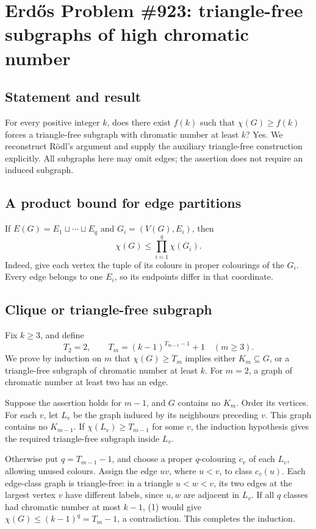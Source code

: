 \section*{Erd\H{o}s Problem \#923: triangle-free subgraphs of high chromatic number}
\subsection*{Statement and result}
For every positive integer \(k\), does there exist \(f(k)\) such that \(\chi(G)\geq f(k)\) forces a triangle-free subgraph with chromatic number at least \(k\)?
Yes. We reconstruct R\"odl's argument and supply the auxiliary triangle-free construction explicitly. All subgraphs here may omit edges; the assertion does not require an induced subgraph.

\subsection*{A product bound for edge partitions}
If \(E(G)=E_1\sqcup\cdots\sqcup E_q\) and \(G_i=(V(G),E_i)\), then
\[
\chi(G)\leq\prod_{i=1}^q\chi(G_i). \tag{1}
\]
Indeed, give each vertex the tuple of its colours in proper colourings of the \(G_i\). Every edge belongs to one \(E_i\), so its endpoints differ in that coordinate.

\subsection*{Clique or triangle-free subgraph}
Fix \(k\geq3\), and define
\[
T_2=2,\qquad T_m=(k-1)^{T_{m-1}-1}+1\quad(m\geq3).
\]
We prove by induction on \(m\) that \(\chi(G)\geq T_m\) implies either \(K_m\subseteq G\), or a triangle-free subgraph of chromatic number at least \(k\). For \(m=2\), a graph of chromatic number at least two has an edge.

Suppose the assertion holds for \(m-1\), and \(G\) contains no \(K_m\). Order its vertices. For each \(v\), let \(L_v\) be the graph induced by its neighbours preceding \(v\). This graph contains no \(K_{m-1}\). If \(\chi(L_v)\geq T_{m-1}\) for some \(v\), the induction hypothesis gives the required triangle-free subgraph inside \(L_v\).

Otherwise put \(q=T_{m-1}-1\), and choose a proper \(q\)-colouring \(c_v\) of each \(L_v\), allowing unused colours. Assign the edge \(uv\), where \(u<v\), to class \(c_v(u)\).
Each edge-class graph is triangle-free: in a triangle \(u<w<v\), its two edges at the largest vertex \(v\) have different labels, since \(u,w\) are adjacent in \(L_v\).
If all \(q\) classes had chromatic number at most \(k-1\), (1) would give
\(\chi(G)\leq(k-1)^q=T_m-1\), a contradiction. This completes the induction.

